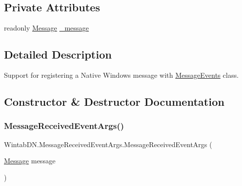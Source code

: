 \subsection*{Private Attributes}
\begin{DoxyCompactItemize}
\item 
readonly \mbox{\hyperlink{class_wintab_d_n_1_1_message_received_event_args_adec3e5d29618d27908ca87ed59805b44}{Message}} \mbox{\hyperlink{class_wintab_d_n_1_1_message_received_event_args_a2cc2a78940d81ea30f41a3001f704d65}{\+\_\+message}}
\end{DoxyCompactItemize}


\subsection{Detailed Description}
Support for registering a Native Windows message with \mbox{\hyperlink{class_wintab_d_n_1_1_message_events}{Message\+Events}} class. 



\subsection{Constructor \& Destructor Documentation}
\mbox{\label{class_wintab_d_n_1_1_message_received_event_args_ae33f9fef5eac0f9a1054d846ff3ff0ab}} 
\subsubsection{\texorpdfstring{Message\+Received\+Event\+Args()}{MessageReceivedEventArgs()}}
{\footnotesize\ttfamily Wintab\+D\+N.\+Message\+Received\+Event\+Args.\+Message\+Received\+Event\+Args (\begin{DoxyParamCaption}\item[{\mbox{\hyperlink{class_wintab_d_n_1_1_message_received_event_args_adec3e5d29618d27908ca87ed59805b44}{Message}}}]{message }\end{DoxyParamCaption})\hspace{0.3cm}{\ttfamily [inline]}}



